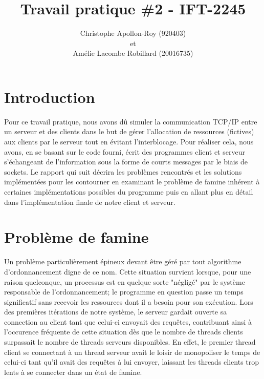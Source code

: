 \documentclass[11pt]{article}
\title{Travail pratique \#2 - IFT-2245}
\author{Christophe Apollon-Roy (920403) \\et \\Amélie Lacombe Robillard (20016735)}
\begin{document}
\maketitle
\section*{ Introduction }
\setlength{\parindent}{20pt}
Pour ce travail pratique, nous avons dû simuler la communication TCP/IP entre un serveur et des clients dans le but de gérer l'allocation de 
ressources (fictives) aux clients par le serveur tout en évitant l'interblocage. Pour réaliser cela, nous avons, en se basant sur le code fourni, 
écrit des programmes client et serveur s'échangeant de l'information sous la forme de courts messages par le biais de sockets. Le rapport qui 
suit décrira les problèmes rencontrés et les solutions implémentées pour les contourner en examinant le problème de famine inhérent à certaines 
implémentations possibles du programme puis en allant plus en détail dans l'implémentation finale de notre client et serveur.
\\
\section*{ Problème de famine }
\setlength{\parindent}{20pt}
Un problème particulièrement épineux devant être géré par tout algorithme d'ordonnancement digne de ce nom. Cette situation survient lorsque, 
pour une raison quelconque, un processus est en quelque sorte "négligé" par le système responsable de l'ordonnancement; le programme en question 
passe un temps significatif sans recevoir les ressources dont il a besoin pour son exécution. Lors des premières itérations de notre système, le 
serveur gardait ouverte sa connection au client tant que celui-ci envoyait des requêtes, contribuant ainsi à l'occurence fréquente de cette 
situation dès que le nombre de threads clients surpassait le nombre de threads serveurs disponibles. En effet, le premier thread client se 
connectant à un thread serveur avait le loisir de monopoliser le temps de celui-ci tant qu'il avait des requêtes à lui envoyer, laissant les 
threads clients trop lents à se connecter dans un état de famine. 
\\ 
\end{document}
